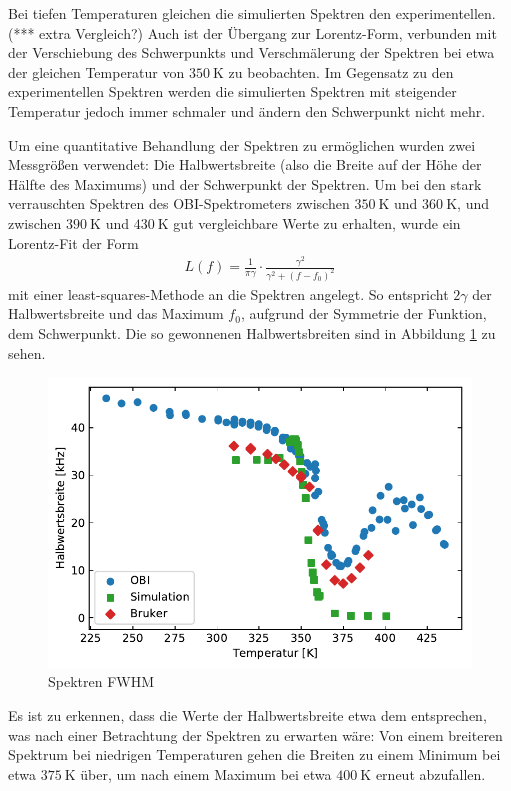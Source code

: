 Bei tiefen Temperaturen gleichen die simulierten Spektren den experimentellen. (*** extra Vergleich?) Auch ist der Übergang zur Lorentz-Form, verbunden mit der Verschiebung des Schwerpunkts und Verschmälerung der Spektren bei etwa der gleichen Temperatur von $\SI{350}{\kelvin}$ zu beobachten. Im Gegensatz zu den experimentellen Spektren werden die simulierten Spektren mit steigender Temperatur jedoch immer schmaler und ändern den Schwerpunkt nicht mehr.


Um eine quantitative Behandlung der Spektren zu ermöglichen wurden zwei Messgrößen verwendet: Die Halbwertsbreite (also die Breite auf der Höhe der Hälfte des Maximums) und der Schwerpunkt der Spektren. Um bei den stark verrauschten Spektren des OBI-Spektrometers zwischen $\SI{350}{\kelvin}$ und $\SI{360}{\kelvin}$, und zwischen $\SI{390}{\kelvin}$ und $\SI{430}{\kelvin}$ gut vergleichbare Werte zu erhalten, wurde ein Lorentz-Fit der Form
\begin{align}
	L(f) = \frac{1}{\pi \gamma} \cdot \frac{\gamma^2}{\gamma^2 + (f - f_0)^2} \label{eqn:res:lorentz}
\end{align}
mit einer least-squares-Methode an die Spektren angelegt. So entspricht $2 \gamma$ der Halbwertsbreite und das Maximum $f_0$, aufgrund der Symmetrie der Funktion, dem Schwerpunkt. Die so gewonnenen Halbwertsbreiten sind in Abbildung \ref{fig:res:spek_fwhm} zu sehen.
\begin{figure}
	\begin{center}
		\includegraphics[width=.9\textwidth]{graphics/plot/fwhm.pdf}
	\end{center}
	\caption{Spektren FWHM} \label{fig:res:spek_fwhm}
\end{figure}
Es ist zu erkennen, dass die Werte der Halbwertsbreite etwa dem entsprechen, was nach einer Betrachtung der Spektren zu erwarten wäre: Von einem breiteren Spektrum bei niedrigen Temperaturen gehen die Breiten zu einem Minimum bei etwa $\SI{375}{\kelvin}$ über, um nach einem Maximum bei etwa $\SI{400}{\kelvin}$ erneut abzufallen.

